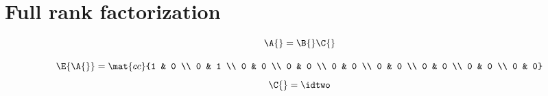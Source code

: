 \section{\label{sec:bevington full}Full rank factorization }

  \begin{equation}
      \A{} = \B{} \C{}
  \end{equation}

  \begin{equation}
      \E{\A{}} = \mat{cc}{1 & 0 \\ 0 & 1 \\ 0 & 0 \\ 0 & 0 \\ 0 & 0 \\ 0 & 0 \\ 0 & 0 \\ 0 & 0 \\ 0 & 0}
  \end{equation}
  \begin{equation}
      \C{} = \idtwo
  \end{equation}

\endinput  %

